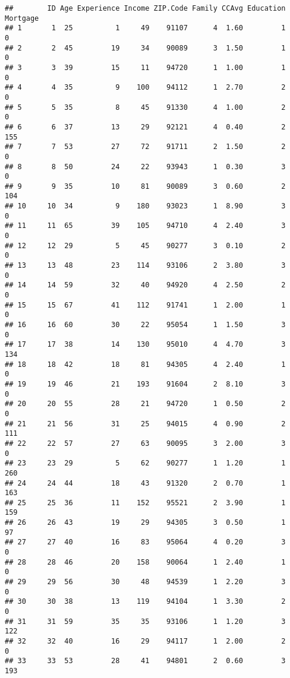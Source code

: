 \documentclass[
]{article}
\begin{document}
\begin{verbatim}
##        ID Age Experience Income ZIP.Code Family CCAvg Education Mortgage
## 1       1  25          1     49    91107      4  1.60         1        0
## 2       2  45         19     34    90089      3  1.50         1        0
## 3       3  39         15     11    94720      1  1.00         1        0
## 4       4  35          9    100    94112      1  2.70         2        0
## 5       5  35          8     45    91330      4  1.00         2        0
## 6       6  37         13     29    92121      4  0.40         2      155
## 7       7  53         27     72    91711      2  1.50         2        0
## 8       8  50         24     22    93943      1  0.30         3        0
## 9       9  35         10     81    90089      3  0.60         2      104
## 10     10  34          9    180    93023      1  8.90         3        0
## 11     11  65         39    105    94710      4  2.40         3        0
## 12     12  29          5     45    90277      3  0.10         2        0
## 13     13  48         23    114    93106      2  3.80         3        0
## 14     14  59         32     40    94920      4  2.50         2        0
## 15     15  67         41    112    91741      1  2.00         1        0
## 16     16  60         30     22    95054      1  1.50         3        0
## 17     17  38         14    130    95010      4  4.70         3      134
## 18     18  42         18     81    94305      4  2.40         1        0
## 19     19  46         21    193    91604      2  8.10         3        0
## 20     20  55         28     21    94720      1  0.50         2        0
## 21     21  56         31     25    94015      4  0.90         2      111
## 22     22  57         27     63    90095      3  2.00         3        0
## 23     23  29          5     62    90277      1  1.20         1      260
## 24     24  44         18     43    91320      2  0.70         1      163
## 25     25  36         11    152    95521      2  3.90         1      159
## 26     26  43         19     29    94305      3  0.50         1       97
## 27     27  40         16     83    95064      4  0.20         3        0
## 28     28  46         20    158    90064      1  2.40         1        0
## 29     29  56         30     48    94539      1  2.20         3        0
## 30     30  38         13    119    94104      1  3.30         2        0
## 31     31  59         35     35    93106      1  1.20         3      122
## 32     32  40         16     29    94117      1  2.00         2        0
## 33     33  53         28     41    94801      2  0.60         3      193

\end{verbatim}
\end{document}

